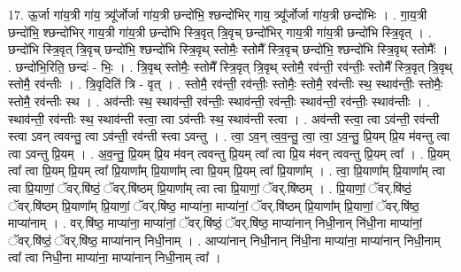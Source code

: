 \documentclass[17pt]{extarticle}
\begin{document}
17. ऊ॒र्जा गा॑य॒त्री गा॑य॒ त्र्यू᳚र्जोर्जा गा॑य॒त्री छन्दो॑भि॒ श्छन्दो॑भिर् गाय॒ त्र्यू᳚र्जोर्जा गा॑य॒त्री छन्दो॑भिः । . गा॒य॒त्री छन्दो॑भि॒ श्छन्दो॑भिर् गाय॒त्री गा॑य॒त्री छन्दो॑भि स्त्रि॒वृत् त्रि॒वृच् छन्दो॑भिर् गाय॒त्री गा॑य॒त्री छन्दो॑भि स्त्रि॒वृत् । . छन्दो॑भि स्त्रि॒वृत् त्रि॒वृच् छन्दो॑भि॒ श्छन्दो॑भि स्त्रि॒वृथ् स्तोमैः॒ स्तोमै᳚ स्त्रि॒वृच् छन्दो॑भि॒ श्छन्दो॑भि स्त्रि॒वृथ् स्तोमैः᳚ । . छन्दो॑भि॒रिति॒ छन्दः॑ - भिः॒ । . त्रि॒वृथ् स्तोमैः॒ स्तोमै᳚ स्त्रि॒वृत् त्रि॒वृथ् स्तोमै॒ रव॑न्ती॒ रव॑न्तीः॒ स्तोमै᳚ स्त्रि॒वृत् त्रि॒वृथ् स्तोमै॒ रव॑न्तीः । . त्रि॒वृदिति॑ त्रि - वृत् । . स्तोमै॒ रव॑न्ती॒ रव॑न्तीः॒ स्तोमैः॒ स्तोमै॒ रव॑न्तीः स्थ॒ स्थाव॑न्तीः॒ स्तोमैः॒ स्तोमै॒ रव॑न्तीः स्थ । . अव॑न्तीः स्थ॒ स्थाव॑न्ती॒ रव॑न्तीः॒ स्थाव॑न्ती॒ रव॑न्तीः॒ स्थाव॑न्ती॒ रव॑न्तीः॒ स्थाव॑न्तीः । . स्थाव॑न्ती॒ रव॑न्तीः स्थ॒ स्थाव॑न्ती स्त्वा॒ त्वा ऽव॑न्तीः स्थ॒ स्थाव॑न्ती स्त्वा । . अव॑न्ती स्त्वा॒ त्वा ऽव॑न्ती॒ रव॑न्ती स्त्वा ऽवन् त्ववन्तु॒ त्वा ऽव॑न्ती॒ रव॑न्ती स्त्वा ऽवन्तु । . त्वा॒ ऽव॒न् त्व॒व॒न्तु॒ त्वा॒ त्वा॒ ऽव॒न्तु॒ प्रि॒यम् प्रि॒य म॑वन्तु त्वा त्वा ऽवन्तु प्रि॒यम् । . अ॒व॒न्तु॒ प्रि॒यम् प्रि॒य म॑वन् त्ववन्तु प्रि॒यम् त्वा᳚ त्वा प्रि॒य म॑वन् त्ववन्तु प्रि॒यम् त्वा᳚ । . प्रि॒यम् त्वा᳚ त्वा प्रि॒यम् प्रि॒यम् त्वा᳚ प्रि॒याणा᳚म् प्रि॒याणा᳚म् त्वा प्रि॒यम् प्रि॒यम् त्वा᳚ प्रि॒याणा᳚म् । . त्वा॒ प्रि॒याणा᳚म् प्रि॒याणा᳚म् त्वा त्वा प्रि॒याणां॒ ॅवर्.षि॑ष्ठं॒ ॅवर्.षि॑ष्ठम् प्रि॒याणा᳚म् त्वा त्वा प्रि॒याणां॒ ॅवर्.षि॑ष्ठम् । . प्रि॒याणां॒ ॅवर्.षि॑ष्ठं॒ ॅवर्.षि॑ष्ठम् प्रि॒याणा᳚म् प्रि॒याणां॒ ॅवर्.षि॑ष्ठ॒ माप्या॑ना॒ माप्या॑नां॒ ॅवर्.षि॑ष्ठम् प्रि॒याणा᳚म् प्रि॒याणां॒ ॅवर्.षि॑ष्ठ॒ माप्या॑नाम् । . वर्.षि॑ष्ठ॒ माप्या॑ना॒ माप्या॑नां॒ ॅवर्.षि॑ष्ठं॒ ॅवर्.षि॑ष्ठ॒ माप्या॑नान् निधी॒नान् नि॑धी॒ना माप्या॑नां॒ ॅवर्.षि॑ष्ठं॒ ॅवर्.षि॑ष्ठ॒ माप्या॑नान् निधी॒नाम् । . आप्या॑नान् निधी॒नान् नि॑धी॒ना माप्या॑ना॒ माप्या॑नान् निधी॒नाम् त्वा᳚ त्वा निधी॒ना माप्या॑ना॒ माप्या॑नान् निधी॒नाम् त्वा᳚ । \newline
\end{document}
